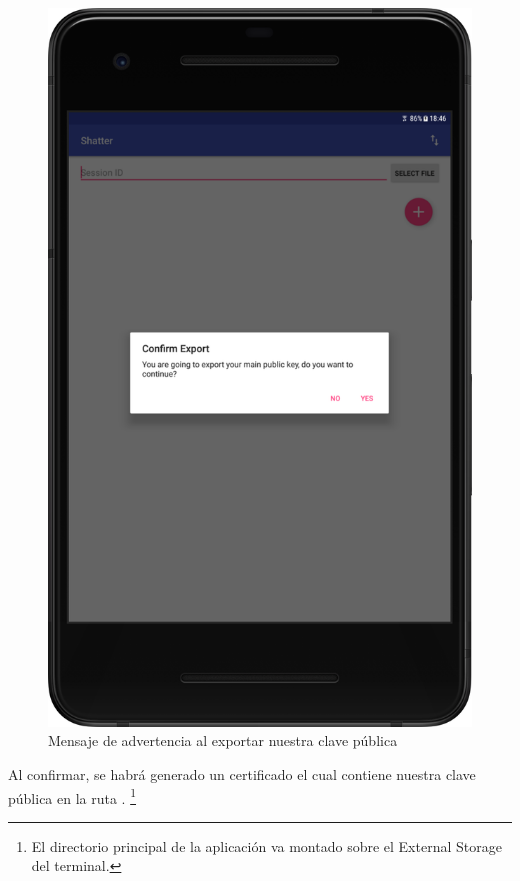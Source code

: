 \begin{figure}[ht]
  \centering
  \includegraphics[scale=0.4]{Figures/export}
  \decoRule
  \caption[Shatter (Exportar clave pública)]{Mensaje de advertencia al exportar
  nuestra clave pública}
  \label{fig:export}
\end{figure}

Al confirmar, se habrá generado un certificado el cual contiene nuestra clave
pública en la ruta . \footnote{El directorio
principal de la aplicación va montado sobre el External Storage del terminal.}

